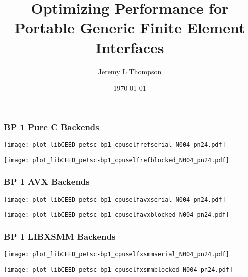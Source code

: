 \documentclass{beamer}
\title[libCEED Finite Element Library]{Optimizing Performance for Portable Generic Finite Element Interfaces} %
\author{Jeremy L Thompson} %
\institute[CU Boulder] %
{University of Colorado Boulder \\ %
\medskip
\textit{jeremy.thompson@colorado.edu} %
}
\date{\today} %
\begin{document}

\begin{frame}
\begin{center}
\frametitle{BP 1 Pure C Backends}

\begin{multicols}{2}

\begin{flushleft}
\texttt{[image: plot\_libCEED\_petsc-bp1\_cpuselfrefserial\_N004\_pn24.pdf]}
\end{flushleft}

\begin{flushright}
\texttt{[image: plot\_libCEED\_petsc-bp1\_cpuselfrefblocked\_N004\_pn24.pdf]}
\end{flushright}

\end{multicols}

\end{center}
\end{frame}


\begin{frame}
\begin{center}
\frametitle{BP 1 AVX Backends}

\begin{multicols}{2}

\begin{flushleft}
\texttt{[image: plot\_libCEED\_petsc-bp1\_cpuselfavxserial\_N004\_pn24.pdf]}
\end{flushleft}

\begin{flushright}
\texttt{[image: plot\_libCEED\_petsc-bp1\_cpuselfavxblocked\_N004\_pn24.pdf]}
\end{flushright}

\end{multicols}

\end{center}
\end{frame}


\begin{frame}
\begin{center}
\frametitle{BP 1 LIBXSMM Backends}

\begin{multicols}{2}

\begin{flushleft}
\texttt{[image: plot\_libCEED\_petsc-bp1\_cpuselfxsmmserial\_N004\_pn24.pdf]}
\end{flushleft}

\begin{flushright}
\texttt{[image: plot\_libCEED\_petsc-bp1\_cpuselfxsmmblocked\_N004\_pn24.pdf]}
\end{flushright}

\end{multicols}

\end{center}
\end{frame}
\end{document}
